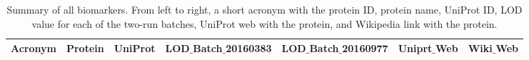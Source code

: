 
\begin{table}[H]

    \caption{Summary of all biomarkers. From left to right, a short acronym with the protein ID, protein name, UniProt ID, LOD value for each of the two-run batches, UniProt web with the protein, and Wikipedia link with the protein.}
    \label{table:SuplementaryAllBiomarkers}

    \centering

 	\renewcommand{\arraystretch}{1.5} 
  
    \begin{tabular}{ lllllll }
        \hline
        \rowcolor[HTML]{ FFFFC7  }

         \textbf{ Acronym } &         \textbf{ Protein } &         \textbf{ UniProt } &         \textbf{ LOD$\_$Batch$\_$20160383 } &         \textbf{ LOD$\_$Batch$\_$20160977 } &         \textbf{ Uniprt$\_$Web } &         \textbf{ Wiki$\_$Web } \\ 
        \hline 


\end{tabular}
\end{table}
